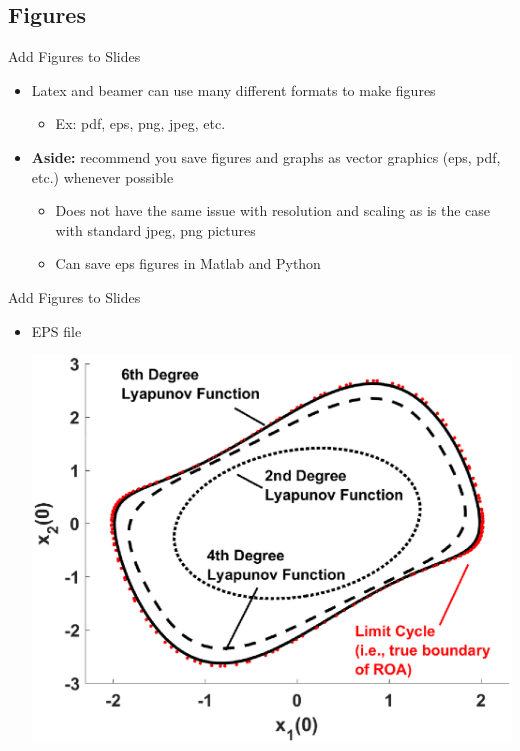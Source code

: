 \subsection{Figures}
\begin{frame}[fragile,t]{Add Figures to Slides}
	\begin{itemize}
		\item Latex and beamer can use many different formats to make figures
		\begin{itemize}
			\item Ex: pdf, eps, png, jpeg, etc.
		\end{itemize}
\vspace{0.2in}
		\item \textbf{Aside:} recommend you save figures and graphs as vector graphics (eps, pdf, etc.) whenever possible
		\begin{itemize}
			\item Does not have the same issue with resolution and scaling as is the case with standard jpeg, png pictures
			\item Can save eps figures in Matlab and Python
		\end{itemize}
	\end{itemize}
\end{frame}

\begin{frame}[fragile,t]{Add Figures to Slides}
	\begin{itemize}
		\item EPS file
		\begin{center}
			\includegraphics[width=0.85\columnwidth]{figures/my_figure.eps}
		\end{center}
	\end{itemize}
\end{frame}

